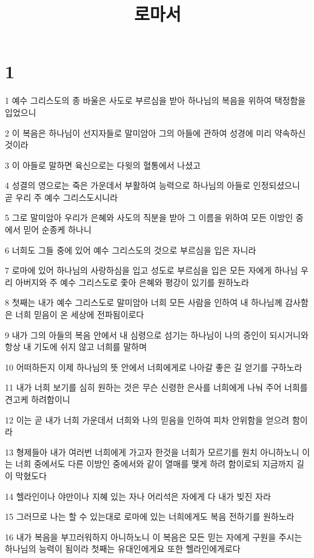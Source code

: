 

\title{로마서}


\chapter{1}

\par 1 예수 그리스도의 종 바울은 사도로 부르심을 받아 하나님의 복음을 위하여 택정함을 입었으니
\par 2 이 복음은 하나님이 선지자들로 말미암아 그의 아들에 관하여 성경에 미리 약속하신 것이라
\par 3 이 아들로 말하면 육신으로는 다윗의 혈통에서 나셨고
\par 4 성결의 영으로는 죽은 가운데서 부활하여 능력으로 하나님의 아들로 인정되셨으니 곧 우리 주 예수 그리스도시니라
\par 5 그로 말미암아 우리가 은혜와 사도의 직분을 받아 그 이름을 위하여 모든 이방인 중에서 믿어 순종케 하나니
\par 6 너희도 그들 중에 있어 예수 그리스도의 것으로 부르심을 입은 자니라
\par 7 로마에 있어 하나님의 사랑하심을 입고 성도로 부르심을 입은 모든 자에게 하나님 우리 아버지와 주 예수 그리스도로 좇아 은혜와 평강이 있기를 원하노라
\par 8 첫째는 내가 예수 그리스도로 말미암아 너희 모든 사람을 인하여 내 하나님께 감사함은 너희 믿음이 온 세상에 전파됨이로다
\par 9 내가 그의 아들의 복음 안에서 내 심령으로 섬기는 하나님이 나의 증인이 되시거니와 항상 내 기도에 쉬지 않고 너희를 말하며
\par 10 어떠하든지 이제 하나님의 뜻 안에서 너희에게로 나아갈 좋은 길 얻기를 구하노라
\par 11 내가 너희 보기를 심히 원하는 것은 무슨 신령한 은사를 너희에게 나눠 주어 너희를 견고케 하려함이니
\par 12 이는 곧 내가 너희 가운데서 너희와 나의 믿음을 인하여 피차 안위함을 얻으려 함이라
\par 13 형제들아 내가 여러번 너희에게 가고자 한것을 너희가 모르기를 원치 아니하노니 이는 너희 중에서도 다른 이방인 중에서와 같이 열매를 맺게 하려 함이로되 지금까지 길이 막혔도다
\par 14 헬라인이나 야만이나 지혜 있는 자나 어리석은 자에게 다 내가 빚진 자라
\par 15 그러므로 나는 할 수 있는대로 로마에 있는 너희에게도 복음 전하기를 원하노라
\par 16 내가 복음을 부끄러워하지 아니하노니 이 복음은 모든 믿는 자에게 구원을 주시는 하나님의 능력이 됨이라 첫째는 유대인에게요 또한 헬라인에게로다
